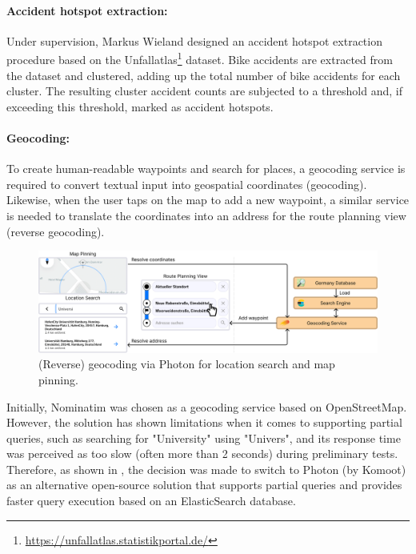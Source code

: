 \paragraph{Accident hotspot extraction:} Under supervision, Markus Wieland \cite{wieland_2022} designed an accident hotspot extraction procedure based on the Unfallatlas\footnote{\url{https://unfallatlas.statistikportal.de/}} dataset. Bike accidents are extracted from the dataset and clustered, adding up the total number of bike accidents for each cluster. The resulting cluster accident counts are subjected to a threshold and, if exceeding this threshold, marked as accident hotspots.

\paragraph{Geocoding:} To create human-readable waypoints and search for places, a geocoding service is required to convert textual input into geospatial coordinates (geocoding). Likewise, when the user taps on the map to add a new waypoint, a similar service is needed to translate the coordinates into an address for the route planning view (reverse geocoding).

\begin{figure}[htbp]
\centering
\includegraphics[width=\linewidth]{images/routing-view-geocoding.png}
\caption{(Reverse) geocoding via Photon for location search and map pinning.}
\label{fig:routing-view-geocoding}
\end{figure}

Initially, Nominatim was chosen as a geocoding service based on OpenStreetMap. However, the solution has shown limitations when it comes to supporting partial queries, such as searching for "University" using "Univers", and its response time was perceived as too slow (often more than 2 seconds) during preliminary tests. Therefore, as shown in , the decision was made to switch to Photon (by Komoot) as an alternative open-source solution that supports partial queries and provides faster query execution based on an ElasticSearch database.

